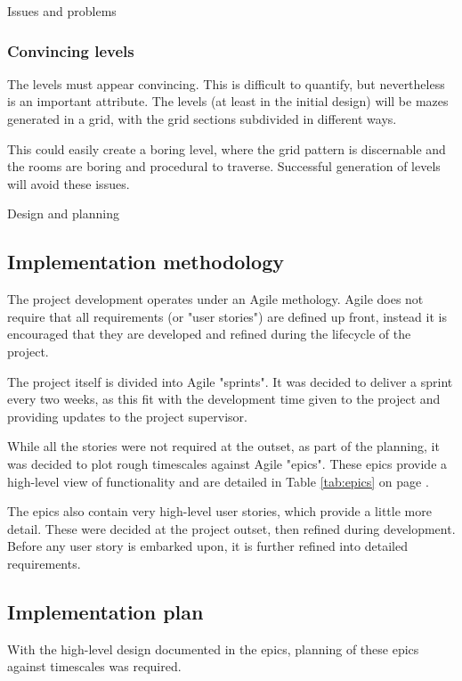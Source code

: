\documentclass[progress]{cmpreport}
\begin{document}
\begin{section}{Issues and problems}
\subsubsection{Convincing levels}
The levels must appear convincing. This is difficult to quantify, but nevertheless is an important attribute. The levels (at least in the initial design) will be mazes generated in a grid, with the grid sections subdivided in different ways.

This could easily create a boring level, where the grid pattern is discernable and the rooms are boring and procedural to traverse. Successful generation of levels will avoid these issues.

\end{section}

\begin{section}{Design and planning}

\subsection{Implementation methodology}
The project development operates under an Agile methology. Agile does not require that all requirements (or "user stories") are defined up front, instead it is encouraged that they are developed and refined during the lifecycle of the project.

The project itself is divided into Agile "sprints". It was decided to deliver a sprint every two weeks, as this fit with the development time given to the project and providing updates to the project supervisor.

While all the stories were not required at the outset, as part of the planning, it was decided to plot rough timescales against Agile "epics". These epics provide a high-level view of functionality and are detailed in Table \ref{tab:epics} on page \pageref{tab:epics}.

The epics also contain very high-level user stories, which provide a little more detail. These were decided at the project outset, then refined during development. Before any user story is embarked upon, it is further refined into detailed requirements. 

\subsection{Implementation plan}

With the high-level design documented in the epics, planning of these epics against timescales was required. 





\end{section}
\end{document}
